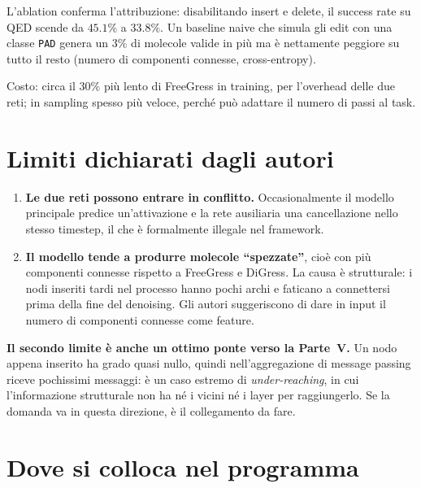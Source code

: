 L'ablation conferma l'attribuzione: disabilitando insert e delete, il success rate su QED scende da $45.1\%$ a $\mathbf{33.8\%}$. Un baseline naive che simula gli edit con una classe \texttt{PAD} genera un $3\%$ di molecole valide in più ma è nettamente peggiore su tutto il resto (numero di componenti connesse, cross-entropy).

Costo: circa il $30\%$ più lento di FreeGress in training, per l'overhead delle due reti; in sampling spesso più veloce, perché può adattare il numero di passi al task.

\section{Limiti dichiarati dagli autori}

\begin{tcolorbox}[mywarn, title={Sono due e precisi: non improvvisarne altri}]
\begin{enumerate}[leftmargin=2em]
  \item \textbf{Le due reti possono entrare in conflitto.} Occasionalmente il modello principale predice un'attivazione e la rete ausiliaria una cancellazione nello stesso timestep, il che è formalmente illegale nel framework.
  \item \textbf{Il modello tende a produrre molecole ``spezzate''}, cioè con più componenti connesse rispetto a FreeGress e DiGress. La causa è strutturale: i nodi inseriti tardi nel processo hanno pochi archi e faticano a connettersi prima della fine del denoising. Gli autori suggeriscono di dare in input il numero di componenti connesse come feature.
\end{enumerate}

\medskip
\textbf{Il secondo limite è anche un ottimo ponte verso la Parte~V.} Un nodo appena inserito ha grado quasi nullo, quindi nell'aggregazione di message passing riceve pochissimi messaggi: è un caso estremo di \emph{under-reaching}, in cui l'informazione strutturale non ha né i vicini né i layer per raggiungerlo. Se la domanda va in questa direzione, è il collegamento da fare.
\end{tcolorbox}

\section{Dove si colloca nel programma}

